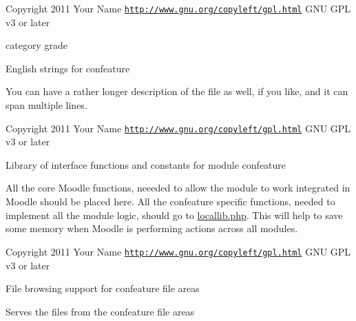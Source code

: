 \begin{DoxyCopyright}{Copyright}
2011 Your Name  \href{http://www.gnu.org/copyleft/gpl.html}{\tt http\-://www.\-gnu.\-org/copyleft/gpl.\-html} G\-N\-U G\-P\-L v3 or later
\end{DoxyCopyright}
category grade

English strings for confeature

You can have a rather longer description of the file as well, if you like, and it can span multiple lines.

\begin{DoxyCopyright}{Copyright}
2011 Your Name  \href{http://www.gnu.org/copyleft/gpl.html}{\tt http\-://www.\-gnu.\-org/copyleft/gpl.\-html} G\-N\-U G\-P\-L v3 or later
\end{DoxyCopyright}
Library of interface functions and constants for module confeature

All the core Moodle functions, neeeded to allow the module to work integrated in Moodle should be placed here. All the confeature specific functions, needed to implement all the module logic, should go to \hyperlink{locallib_8php}{locallib.\-php}. This will help to save some memory when Moodle is performing actions across all modules.

\begin{DoxyCopyright}{Copyright}
2011 Your Name  \href{http://www.gnu.org/copyleft/gpl.html}{\tt http\-://www.\-gnu.\-org/copyleft/gpl.\-html} G\-N\-U G\-P\-L v3 or later
\end{DoxyCopyright}
File browsing support for confeature file areas

Serves the files from the confeature file areas 